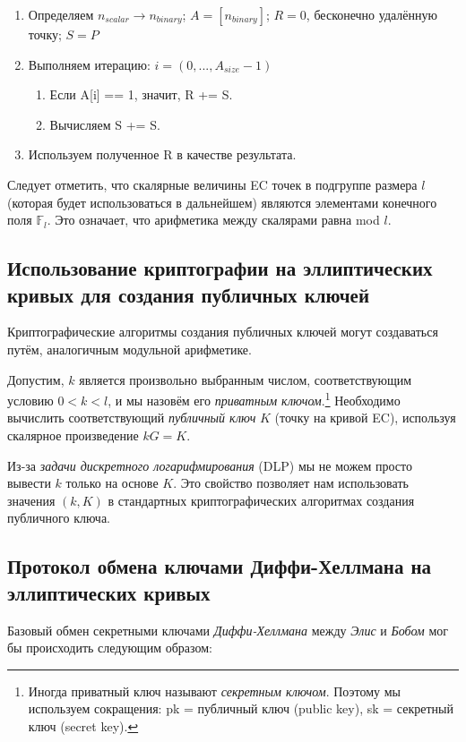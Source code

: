\begin{enumerate}
	\item Определяем $n_{scalar} \rightarrow n_{binary}$; $A = [n_{binary}]$; $R = 0$, бесконечно удалённую точку; $S = P$
	\item Выполняем итерацию: $i = (0,...,A_{size} - 1)$
	\begin{enumerate}
		\item Если A[i] == 1, значит, R += S.
		\item Вычисляем S += S.
	\end{enumerate}
	\item Используем полученное R в качестве результата.
\end{enumerate}

Следует отметить, что скалярные величины EC точек в подгруппе размера $l$ (которая будет использоваться в дальнейшем) являются элементами конечного поля $\mathbb{F}_l$. Это означает, что арифметика между скалярами равна mod $l$.


\subsection{Использование криптографии на эллиптических кривых для созда\-ния публичных ключей}
\label{ec:keys}
Криптографические алгоритмы создания публичных ключей могут создаваться путём, анало\-гичным модульной арифметике.

Допустим, \(k\) является произвольно выбранным числом, соответствующим условию \(0 < k < l\), и мы назовём его {\em приватным ключом}.\footnote{Иногда приватный ключ называют  {\em секретным ключом}. Поэтому мы используем сокращения: pk = публичный ключ (public key), sk = секретный ключ (secret key).} Необходимо вычислить соответствующий {\em публичный ключ} \(K\) (точку на кривой EC), используя скалярное произведение \(k G = K\). 

Из-за {\em задачи дискретного логарифмирования} (DLP) мы не можем просто вывести \(k\) только на основе \(K\). Это свойство позволяет нам использовать значения \((k, K)\) в стандартных криптографических алгоритмах создания публичного ключа.


\subsection{Протокол обмена ключами Диффи-Хеллмана на эллиптических кри\-вых}
\label{DH_exchange_section}

Базовый обмен секретными ключами {\em Диффи-Хеллмана} \cite{Diffie-Hellman} между {\em Элис} и {\em Бобом} мог бы происходить следующим образом:

